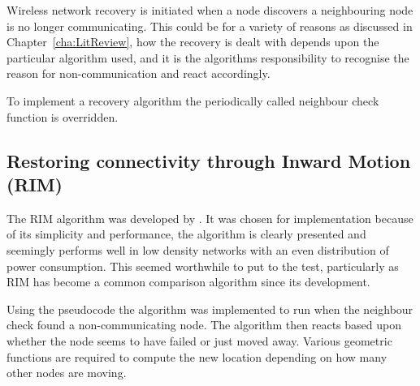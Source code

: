 \documentclass[authoryearcitations]{UoYCSproject}
\begin{document}
Wireless network recovery is initiated when a node discovers a neighbouring node is no longer communicating. This could be for a variety of reasons as discussed in Chapter~\ref{cha:LitReview}, how the recovery is dealt with depends upon the particular algorithm used, and it is the algorithms responsibility to recognise the reason for non-communication and react accordingly.

To implement a recovery algorithm the periodically called neighbour check function is overridden.

\subsection{Restoring connectivity through Inward Motion (RIM)}

The RIM algorithm was developed by \citet*{Younis2010}. It was chosen for implementation because of its simplicity and performance, the algorithm is clearly presented and seemingly performs well in low density networks with an even distribution of power consumption. This seemed worthwhile to put to the test, particularly as RIM has become a common comparison algorithm since its development.

Using the pseudocode the algorithm was implemented to run when the neighbour check found a non-communicating node. The algorithm then reacts based upon whether the node seems to have failed or just moved away. Various geometric functions are required to compute the new location depending on how many other nodes are moving.
\end{document}
